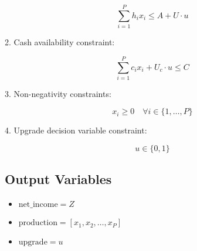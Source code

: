 \documentclass{article}
\begin{document}
\[
\sum_{i=1}^{P} h_i x_i \leq A + U \cdot u
\]

2. Cash availability constraint:

\[
\sum_{i=1}^{P} c_i x_i + U_c \cdot u \leq C
\]

3. Non-negativity constraints:

\[
x_i \geq 0 \quad \forall i \in \{1, \ldots, P\}
\]

4. Upgrade decision variable constraint:

\[
u \in \{0, 1\}
\]

\subsection*{Output Variables}
\begin{itemize}
    \item $\text{net\_income} = Z$
    \item $\text{production} = [x_1, x_2, \ldots, x_P]$
    \item $\text{upgrade} = u$
\end{itemize}
\end{document}
